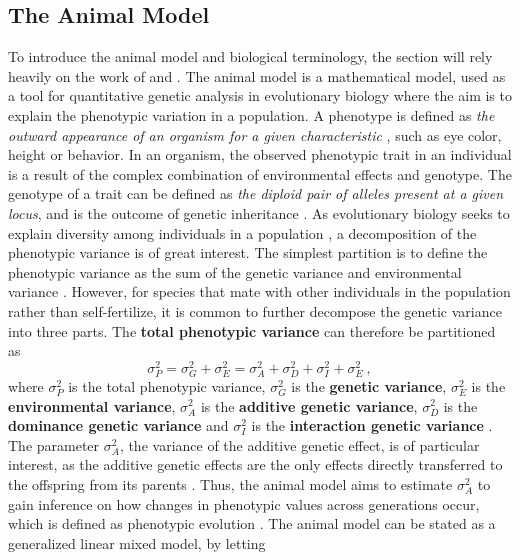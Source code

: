 \subsection*{The Animal Model}
To introduce the animal model and biological terminology, the section will rely heavily on the work of \citet{Kruuk2004} and \citet{ConnerHartl2004}. 
The animal model is a mathematical model, used as a tool for quantitative genetic analysis in evolutionary biology where the aim is to explain the phenotypic variation in a population.
A phenotype is defined as \textit{the outward appearance of an organism for a given characteristic} \citep{ConnerHartl2004}, such as eye color, height or behavior. 
In an organism, the observed phenotypic trait in an individual is a result of the complex combination of environmental effects and genotype. 
The genotype of a trait can be defined as \textit{the diploid pair of alleles present at a given locus}, and is the outcome of genetic inheritance \citep{ConnerHartl2004}. 
As evolutionary biology seeks to explain diversity among individuals in a population \citep{Kruuk2004}, a decomposition of the phenotypic variance is of great interest. 
The simplest partition is to define the phenotypic variance as the sum of the genetic variance and environmental variance \citep{ConnerHartl2004}. 
However, for species that mate with other individuals in the population rather than self-fertilize, it is common to further decompose the genetic variance into three parts. 
The \textbf{total phenotypic variance} can therefore be partitioned as
\begin{equation}
    \sigma^2_P = \sigma^2_G + \sigma^2_E = \sigma^2_A + \sigma^2_D + \sigma^2_I + \sigma^2_E \ ,
\end{equation}
where $\sigma^2_P$ is the total phenotypic variance, $\sigma^2_G$ is the \textbf{genetic variance}, $\sigma^2_E$ is the \textbf{environmental variance}, $\sigma^2_A$ is the \textbf{additive genetic variance}, $\sigma^2_D$ is the \textbf{dominance genetic variance} and $\sigma^2_I$ is the \textbf{interaction genetic variance} \citep{ConnerHartl2004}.
The parameter $\sigma^2_A$, the variance of the additive genetic effect, is of particular interest, as the additive genetic effects are the only effects directly transferred to the offspring from its parents \citep{ConnerHartl2004}.
Thus, the animal model aims to estimate $\sigma^2_A$ to gain inference on how changes in phenotypic values across generations occur, which is defined as phenotypic evolution \citep{ConnerHartl2004}.
The animal model can be stated as a generalized linear mixed model, by letting 
